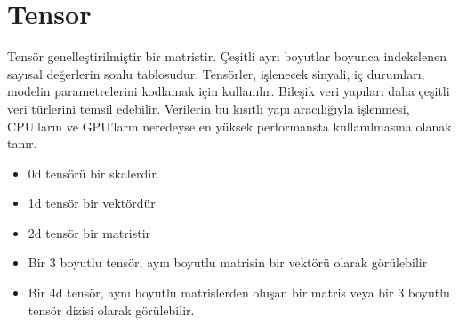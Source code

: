 \section{Tensor}
Tensör genelleştirilmiştir bir matristir. Çeşitli ayrı boyutlar boyunca indekslenen sayısal değerlerin sonlu tablosudur. Tensörler, işlenecek sinyali, iç durumları, modelin parametrelerini kodlamak için kullanılır. Bileşik veri yapıları daha çeşitli veri türlerini temsil edebilir. Verilerin bu kısıtlı yapı aracılığıyla işlenmesi, CPU'ların ve GPU'ların neredeyse en yüksek performansta kullanılmasına olanak tanır.
\begin{itemize}
    \item 0d tensörü bir skalerdir.
    \item 1d tensör bir vektördür
    \item 2d tensör bir matristir
    \item Bir 3 boyutlu tensör, aynı boyutlu matrisin bir vektörü olarak görülebilir
    \item Bir 4d tensör, aynı boyutlu matrislerden oluşan bir matris veya bir 3 boyutlu tensör dizisi olarak görülebilir.
\end{itemize}

\newpage